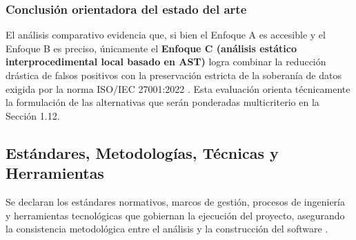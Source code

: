 \subsubsection*{Conclusión orientadora del estado del arte}
El análisis comparativo evidencia que, si bien el Enfoque A es accesible y el Enfoque B es preciso, únicamente el \textbf{Enfoque C (análisis estático interprocedimental local basado en AST)} logra combinar la reducción drástica de falsos positivos con la preservación estricta de la soberanía de datos exigida por la norma ISO/IEC 27001:2022 \parencite{ladisa2023sok, torres2026proyecto}. %
Esta evaluación orienta técnicamente la formulación de las alternativas que serán ponderadas multicriterio en la Sección 1.12.

\subsection{Estándares, Metodologías, Técnicas y Herramientas}
Se declaran los estándares normativos, marcos de gestión, procesos de ingeniería y herramientas tecnológicas que gobiernan la ejecución del proyecto, asegurando la consistencia metodológica entre el análisis y la construcción del software \parencite{iso2018req}. 


